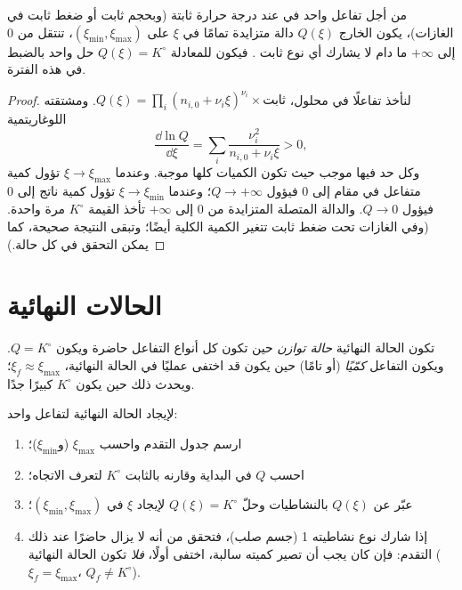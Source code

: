 \begin{proposition}\label{prop:b1:extent-q-and-k:q-monotone}
من أجل تفاعل واحد في  عند درجة حرارة ثابتة (وبحجم ثابت أو ضغط
ثابت في الغازات)، يكون الخارج $Q(\xi)$ دالة متزايدة
تمامًا في $\xi$ على $(\xi_{\min}, \xi_{\max})$، تنتقل من 0
إلى $+\infty$ ما دام لا يشارك أي نوع ثابت . فيكون
للمعادلة $Q(\xi) = K^\circ$ حل واحد بالضبط في هذه
الفترة.
\end{proposition}

\begin{proof}
لنأخذ تفاعلًا في محلول، $Q(\xi) = \prod_i (n_{i,0} + \nu_i\xi)^{\nu_i}
\times \text{ثابت}$. ومشتقته اللوغاريتمية
\[
  \frac{\dd \ln Q}{\dd \xi} = \sum_i \frac{\nu_i^2}{n_{i,0} + \nu_i \xi}
  > 0 ,
\]
وكل حد فيها موجب حيث تكون الكميات كلها موجبة. وعندما $\xi \to \xi_{\max}$ تؤول
كمية متفاعل في مقام إلى 0 فيؤول $Q \to +\infty$؛ وعندما $\xi
\to \xi_{\min}$ تؤول كمية ناتج إلى 0 فيؤول $Q \to 0$. والدالة المتصلة
المتزايدة من 0 إلى $+\infty$ تأخذ القيمة $K^\circ$ مرة واحدة.
(وفي الغازات تحت ضغط ثابت تتغير الكمية الكلية أيضًا؛ وتبقى النتيجة
صحيحة، كما يمكن التحقق في كل حالة.)
\end{proof}

\section{الحالات النهائية}

\begin{definition}\label{def:b1:extent-q-and-k:quantitative}
تكون الحالة النهائية \emph{حالة توازن}
حين تكون كل أنواع التفاعل حاضرة ويكون $Q = K^\circ$. ويكون
التفاعل \emph{كمّيًا} (أو تامًا)
حين يكون  قد اختفى عمليًا في الحالة النهائية،
$\xi_f \approx \xi_{\max}$؛ ويحدث ذلك حين يكون $K^\circ$
كبيرًا جدًا.
\end{definition}

\begin{method}\label{met:b1:extent-q-and-k:final-state}
لإيجاد الحالة النهائية لتفاعل واحد:
\begin{enumerate}
  \item ارسم جدول التقدم واحسب $\xi_{\max}$ (و$\xi_{\min}$)؛
  \item احسب $Q$ في البداية وقارنه بالثابت $K^\circ$ لتعرف
        الاتجاه؛
  \item عبّر عن $Q(\xi)$ بالنشاطيات وحلّ $Q(\xi) = K^\circ$
        لإيجاد $\xi$ في $(\xi_{\min}, \xi_{\max})$؛
  \item إذا شارك نوع نشاطيته 1 (جسم صلب)، فتحقق من أنه
        لا يزال حاضرًا عند ذلك التقدم: فإن كان يجب أن تصير كميته سالبة،
        اختفى أولًا، \emph{فلا} تكون الحالة النهائية
         ($\xi_f = \xi_{\max}$، $Q_f \ne K^\circ$).
\end{enumerate}
\end{method}

